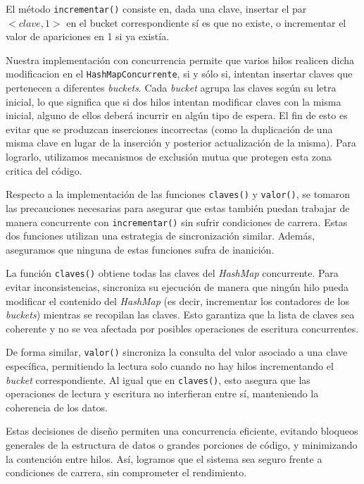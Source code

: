 \documentclass[a4paper]{article}
\begin{document}
    El método \texttt{incrementar()} consiste en, dada una clave, insertar el par $<clave, 1>$ en el bucket correspondiente sí es que no existe, o incrementar el valor de apariciones en 1 si ya existía.

    Nuestra implementación con concurrencia permite que varios hilos realicen dicha modificacion en el \texttt{HashMapConcurrente}, si y sólo si, intentan insertar claves que pertenecen a diferentes \textit{buckets}. Cada \textit{bucket} agrupa las claves según su letra inicial, lo que significa que si dos hilos intentan modificar claves con la misma inicial, alguno de ellos deberá incurrir en algún tipo de espera. El fin de esto es evitar que se produzcan inserciones incorrectas (como la duplicación de una misma clave en lugar de la inserción y posterior actualización de la misma). Para lograrlo, utilizamos mecanismos de exclusión mutua que protegen esta zona critica del código.

    Respecto a la implementación de las funciones \texttt{claves()} y \texttt{valor()}, se tomaron las precauciones necesarias para asegurar que estas también puedan trabajar de manera concurrente con \texttt{incrementar()} sin sufrir condiciones de carrera. Estas dos funciones utilizan una estrategia de sincronización similar. Además, aseguramos que ninguna de estas funciones sufra de inanición.

    La función \texttt{claves()} obtiene todas las claves del \textit{HashMap} concurrente. Para evitar inconsistencias, sincroniza su ejecución de manera que ningún hilo pueda modificar el contenido del \textit{HashMap} (es decir, incrementar los contadores de los \textit{buckets}) mientras se recopilan las claves. Esto garantiza que la lista de claves sea coherente y no se vea afectada por posibles operaciones de escritura concurrentes.

    De forma similar, \texttt{valor()} sincroniza la consulta del valor asociado a una clave específica, permitiendo la lectura solo cuando no hay hilos incrementando el \textit{bucket} correspondiente. Al igual que en \texttt{claves()}, esto asegura que las operaciones de lectura y escritura no interfieran entre sí, manteniendo la coherencia de los datos.

    Estas decisiones de diseño permiten una concurrencia eficiente, evitando bloqueos generales de la estructura de datos o grandes porciones de código, y minimizando la contención entre hilos. Así, logramos que el sistema sea seguro frente a condiciones de carrera, sin comprometer el rendimiento.
\end{document}
